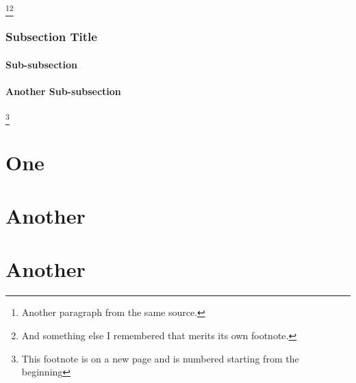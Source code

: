 \documentclass[12pt, oneside]{report}
\begin{document}
\lipsum[4]
\footnote{Another paragraph from the same source.}\footnote{And something else I remembered that merits its own footnote.}

\subsection{Subsection Title}
\lipsum[5]

\subsubsection{Sub-subsection}
\lipsum[6-7]
\subsubsection{Another Sub-subsection}
\lipsum[8-9]\footnote{This footnote is on a new page and is numbered starting from the beginning}

\section{\lipsum[150][4]}

\subsection{\lipsum[150][8]}
\lipsum[10]

\unpacklipsum[150][5]
\chapter{\lipsumexp}

\section{\lipsum[150][6]}
\lipsum[5-6]

\section{\lipsum[150][7]}
\lipsum[7]

\chapter{One}
\chapter{Another}
\chapter{Another}
\end{document}
